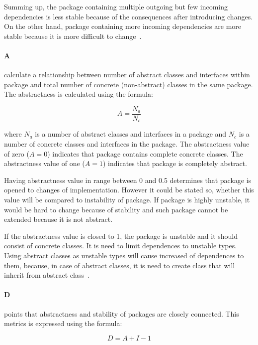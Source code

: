 Summing up, the package containing multiple outgoing but few incoming dependencies is less stable because of the consequences after introducing changes. On the other hand, package containing more incoming dependencies are more stable because it is more difficult to change~\cite{martin}.


\paragraph{\ac{A}} calculate a relationship between number of  abstract classes and interfaces within package and total number of concrete (non-abstract) classes in the same package. The abstractness is calculated using the formula:

\begin{equation}
A=\frac {N_{a}}{N_{c}} 
\end{equation}

where $N_{a}$ is a number of abstract classes and interfaces in a package and $N_{c}$ is a number of concrete classes and interfaces in the package. The abstractness value of zero ($A=0$) indicates that package contains complete concrete classes. The abstractness value of one ($A=1$) indicates that package is completely abstract. 

Having abstractness value in range between 0 and 0.5 determines that package is opened to changes of implementation. However it could be stated so, whether this value will be compared to instability of package. If package is highly unstable, it would be hard to change because of stability and such package cannot be extended because it is not abstract.

If the abstractness value is closed to 1, the package is unstable and it should consist of concrete classes. It is need to limit dependences to unstable types. Using abstract classes as unstable types will cause increased of dependences to them, because, in case of abstract classes, it is need to create class that will inherit from abstract class~\cite{martin}.


\paragraph{\ac{D}} points that abstractness and stability of packages are closely connected. This metrics is expressed using the formula:

\begin{equation}
D = A + I - 1
\end{equation}

